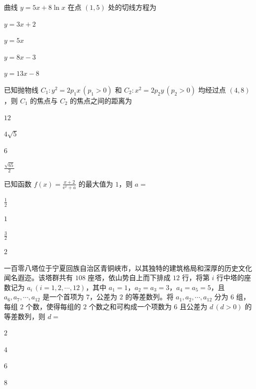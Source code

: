 \documentclass{exam-zh}
\begin{document}
\begin{question}
  曲线 $y = 5x + 8\ln x$ 在点 $(1, 5)$ 处的切线方程为 \paren
  \begin{choices}
    \item $y = 3x + 2$
    \item $y = 5x$
    \item $y = 8x - 3$
    \item $y = 13x - 8$
  \end{choices}
\end{question}

\begin{question}
  已知抛物线 $C_1: y^2 = 2p_1x \, (p_1 > 0)$ 和 $C_2: x^2 = 2p_2y \, (p_2 > 0)$ 均经过点 $(4, 8)$，则 $C_1$ 的焦点与 $C_2$ 的焦点之间的距离为 \paren
  \begin{choices}
    \item $12$
    \item $4\sqrt{5}$
    \item $6$
    \item $\frac{\sqrt{65}}{2}$
  \end{choices}
\end{question}

\begin{question}
  已知函数 $f(x) = \frac{x+2}{\mathrm{e}^x + a}$ 的最大值为 $1$，则 $a =$ \paren
  \begin{choices}
    \item $\frac{1}{2}$
    \item $1$
    \item $\frac{3}{2}$
    \item $2$
  \end{choices}
\end{question}

\begin{question}
  一百零八塔位于宁夏回族自治区青铜峡市，以其独特的建筑格局和深厚的历史文化闻名遐迩。该塔群共有 $108$ 座塔，依山势自上而下排成 $12$ 行，将第 $i$ 行中塔的座数记为 $a_i \, (i = 1, 2, \cdots, 12)$，其中 $a_1=1$，$a_2=a_3=3$，$a_4=a_5=5$，且 $a_6, a_7, \cdots, a_{12}$ 是一个首项为 $7$，公差为 $2$ 的等差数列。将 $a_1, a_2, \cdots, a_{12}$ 分为 $6$ 组，每组 $2$ 个数，使得每组的 $2$ 个数之和可构成一个项数为 $6$ 且公差为 $d \, (d > 0)$ 的等差数列，则 $d =$ \paren
  \begin{choices}
    \item $2$
    \item $4$
    \item $6$
    \item $8$
  \end{choices}
\end{question}
\end{document}

